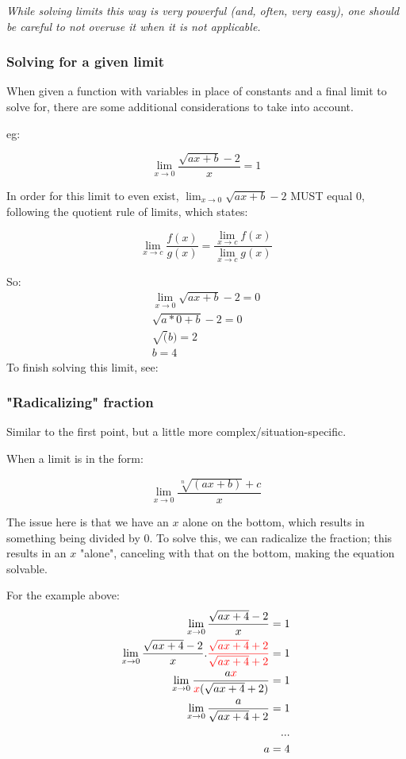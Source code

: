 \documentclass[12pt]{article}
\begin{document}
\textit{While solving limits this way is very powerful (and, often, very easy), one should be careful to not overuse it when it is not applicable.}

\subsubsection{Solving for a given limit}

When given a function with variables in place of constants and a final limit to solve for, there are some additional considerations to take into account.

eg:

$$\lim_{x\to0}\frac{\sqrt{ax + b} - 2}{x} = 1$$

In order for this limit to even exist, $\lim_{x\to0} \sqrt{ax + b} - 2$ MUST equal 0, following the quotient rule of limits, which states:

$$\lim_{x\to c} \frac{f(x)}{g(x)} = \frac{\lim_{x\to c} f(x)}{\lim_{x\to c} g(x)}$$

So:
\begin{equation}
\begin{split}
    \lim_{x\to0} \sqrt{ax + b} - 2 = 0\\
    \sqrt{a*0 + b} - 2 = 0\\
    \sqrt(b) = 2\\
    b = 4
\end{split}
\end{equation}
To finish solving this limit, see:

\subsubsection{"Radicalizing" fraction}

Similar to the first point, but a little more complex/situation-specific.

When a limit is in the form:

$$\lim_{x\to 0}\frac{\sqrt[n]{(ax+b)} + c}{x}$$

The issue here is that we have an $x$ alone on the bottom, which results in something being divided by 0. To solve this, we can radicalize the fraction; this results in an $x$ "alone", canceling with that on the bottom, making the equation solvable.

For the example above:
\begin{equation}
\begin{split}
    \lim_{x\to0} \frac{\sqrt{ax + 4} - 2}{x} = 1\\
    \lim_{x\to0} \frac{\sqrt{ax + 4} - 2}{x}.\textcolor{red}{\frac{\sqrt{ax + 4} + 2}{\sqrt{ax + 4} + 2}} = 1\\
    \lim_{x\to0} \frac{a\textcolor{red}{x}}{\textcolor{red}{x}(\sqrt{ax+4}+2)} = 1\\
    \lim_{x\to 0} \frac{a}{\sqrt{ax + 4} + 2} = 1\\
    ...\\
    a = 4
\end{split}
\end{equation}
\end{document}
